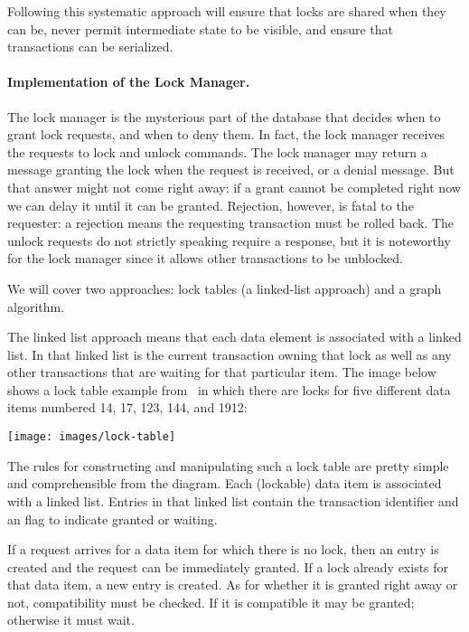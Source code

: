 \documentclass[a4paper]{report}
\begin{document}
Following this systematic approach will ensure that locks are shared when they can be, never permit intermediate state to be visible, and ensure that transactions can be serialized.

\paragraph{Implementation of the Lock Manager.} The lock manager is the mysterious part of the database that decides when to grant lock requests, and when to deny them. In fact, the lock manager receives the requests to lock and unlock commands. The lock manager may return a message granting the lock when the request is received, or a denial message. But that answer might not come right away: if a grant cannot be completed right now we can delay it until it can be granted. Rejection, however, is fatal to the requester: a rejection means the requesting transaction must be rolled back. The unlock requests do not strictly speaking require a response, but it is noteworthy for the lock manager since it allows other transactions to be unblocked.

We will cover two approaches: lock tables (a linked-list approach) and a graph algorithm.

The linked list approach means that each data element is associated with a linked list. In that linked list is the current transaction owning that lock as well as any other transactions that are waiting for that particular item. The image below shows a lock table example from~\cite{dsc} in which there are locks for five different data items numbered 14, 17, 123, 144, and 1912:

\begin{center}
	\texttt{[image: images/lock-table]}
\end{center}

The rules for constructing and manipulating such a lock table are pretty simple and comprehensible from the diagram. Each (lockable) data item is associated with a linked list. Entries in that linked list contain the transaction identifier and an flag to indicate granted or waiting.

If a request arrives for a data item for which there is no lock, then an entry is created and the request can be immediately granted. If a lock already exists for that data item, a new entry is created. As for whether it is granted right away or not, compatibility must be checked. If it is compatible it may be granted; otherwise it must wait.
\end{document}
